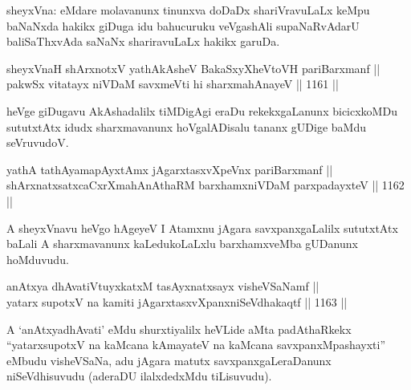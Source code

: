 \begin{artha}
sheyxVna: eMdare molavanunx tinunxva doDaDx shariVravuLaLx keMpu baNaNxda hakikx giDuga idu bahucuruku veVgashAli supaNaRvAdarU baliSaThxvAda saNaNx shariravuLaLx hakikx garuDa.
\end{artha}

\begin{shl}
sheyxVnaH shArxnotxV yathA\s \s kAsheV BakaSxyXheVtoVH pariBarxmanf || \\
pakwSx vitatayx niVDaM savxmeVti hi sharxmahAnayeV \hfill || 1161 || 
\end{shl}

\begin{artha}
heVge giDugavu AkAshadalilx tiMDigAgi eraDu rekekxgaLanunx bicicxkoMDu sututxtAtx idudx sharxmavanunx hoVgalADisalu tananx gUDige baMdu seVruvudoV.
\end{artha}

\begin{shl}
yathA tathA\s yamapAyxtAmx jAgarxtasxvXpeVnx pariBarxmanf || \\
shArxnatxsatxcaCxrXmahAnAthaRM barxhamxniVDaM parxpadayxteV \hfill || 1162 ||  
\end{shl}

\begin{artha}
A sheyxVnavu heVgo hAgeyeV I Atamxnu jAgara savxpanxgaLalilx sututxtAtx baLali A sharxmavanunx kaLedukoLaLxlu barxhamxveMba gUDanunx hoMduvudu.
\end{artha}


\begin{shl}
anAtxya dhAvatiVtuyxkatxM tasAyxnatxsayx visheVSaNamf || \\
yatarx supotxV na kamiti jAgarxtasxvXpanxniSeVdhakaqtf \hfill || 1163 ||  
\end{shl}

\begin{artha}
A `anAtxyadhAvati' eMdu shurxtiyalilx heVLide aMta padAthaRkekx ``yatarxsupotxV na kaMcana kAmayateV na kaMcana savxpanxMpashayxti'' eMbudu visheVSaNa, adu jAgara matutx savxpanxgaLeraDanunx niSeVdhisuvudu (aderaDU ilalxdedxMdu tiLisuvudu).
\end{artha}



